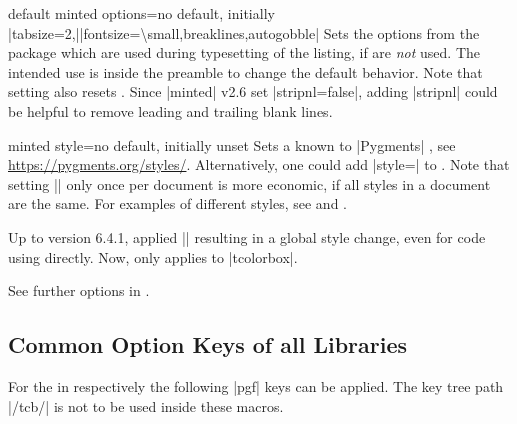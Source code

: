 \clearpage
\begin{docTcbKey}[][doc new={2021-12-15}]{default minted options}{=}{no default, initially
    |tabsize=2,|\linebreak|fontsize=\textbackslash small,breaklines,autogobble|}
  Sets the options from the package  \cite{poore:minted}
  which are used during typesetting of the listing, if
   are \emph{not} used. The intended use is
  inside the preamble to change the default behavior.
  Note that setting  also resets .
  Since |minted| \cite{poore:minted} v2.6 set |stripnl=false|, adding
  |stripnl| could be helpful to remove leading and trailing blank lines.
\begin{dispListing}
\end{dispListing}
\end{docTcbKey}



\begin{docTcbKey}[][doc updated=2024-11-07]{minted style}{=}{no default, initially unset}
Sets a  known to |Pygments| \cite{pygments:web}, see \url{https://pygments.org/styles/}.
Alternatively, one could add |style=| to .
Note that
setting |\usemintedstyle| only once per document is more economic, if
all styles in a document are the same.
For examples of different styles, see
 and .

\begin{marker}
Up to version 6.4.1,  applied |\usemintedstyle|
resulting in a global style change, even for code using  directly.
Now,  only applies to |tcolorbox|.
\end{marker}

\end{docTcbKey}

See further options in .



\clearpage
\subsection{Common Option Keys of all Libraries}\label{sec:commonlistingkeys}
For the  in  respectively 
the following |pgf| keys can be applied. The key tree path |/tcb/| is not to
be used inside these macros.

